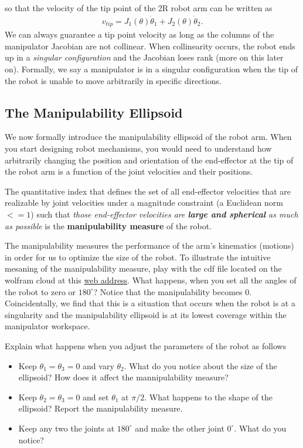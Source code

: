 % 
so that the velocity of the tip point of the 2R robot arm can be written as 
%
\begin{align}
	v_{tip} = J_1(\theta)\dot{\theta}_1 + J_2(\theta)\dot{\theta}_2.
\end{align}
%
We can always guarantee a tip point velocity as long as the columns of the manipulator Jacobian are not collinear. When collinearity occurs, the robot ends up in a \textit{singular configuration} and the Jacobian loses rank (more on this later on). Formally, we say a manipulator is in a singular configuration when the tip of the robot is unable to move arbitrarily in specific directions.

\subsection{The Manipulability Ellipsoid}
%
We now formally introduce the manipulability ellipsoid of the robot arm. When you start designing robot mechanisms, you would need to understand how arbitrarily changing the position and orientation of the end-effector at the tip of the robot arm is a function of the joint velocities and their positions. 
\begin{definition}
	The quantitative index that defines the set of all end-effector velocities that are realizable by joint velocities under a magnitude constraint (\eg a Euclidean norm  $<=1$) such that \textit{those end-effector velocities are \textbf{large and spherical} as much as possible} is the \textbf{manipulability measure} of the robot.
\end{definition}

The manipulability measures the performance of the arm's kinematics (motions) in order for us to optimize the size of the robot. To illustrate the intuitive mesaning of the manipulability measure, play with the cdf file located on the wolfram cloud at this \href{https://demonstrations.wolfram.com/ManipulabilityEllipsoidOfARobotArm/}{web address}. What happens, when you set all the angles of the robot to zero or $180^\circ$? Notice that the manipulability becomes $0$. Coincidentally, we find that this is a situation that occurs when the robot is at a singularity and the manipulability ellipsoid is at its lowest coverage within the manipulator workspace.

\begin{homework}
	Explain what happens when you adjust the parameters of the robot as follows 
	\begin{itemize}
		\item Keep $\theta_1 = \theta_3 = 0$ and vary $\theta_2$. What do you notice about the size of the ellipsoid? How does it affect the mannipulability measure? 
		\item Keep $\theta_2 = \theta_3 = 0$ and set $\theta_1$ at $\pi/2$. What happens to the shape of the ellipsoid? Report the manipulability measure.
		\item Keep any  two the joints at $180^\circ$ and make the other joint $0^\circ$. What do you notice?
	\end{itemize}
\end{homework}

